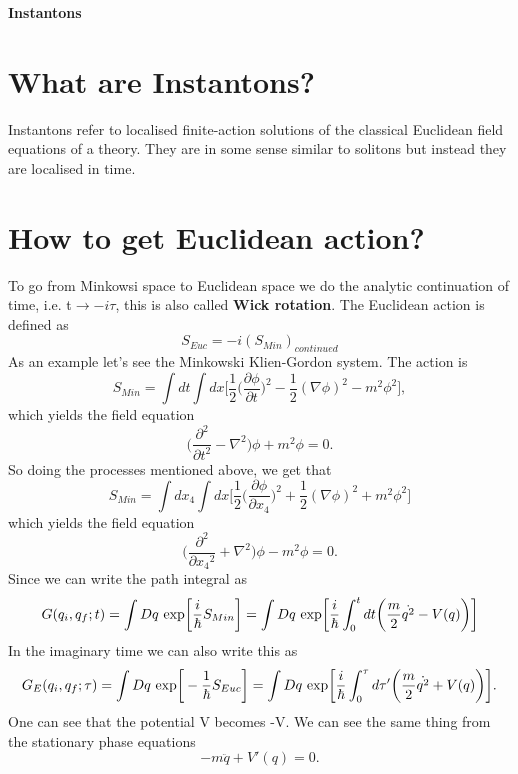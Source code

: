\documentclass[a4paper, 12pt]{article}
\begin{document}
\begin{center} 
{\Huge{\textbf{Instantons}}}\\
\end{center}

\section {What are Instantons?}
Instantons refer to localised finite-action solutions of the classical Euclidean field equations of a theory. They are in some sense similar to solitons but instead they are localised in time. 
\section {How to get Euclidean action?}
To go from Minkowsi space to Euclidean space we do the analytic continuation of time, i.e. t$\to -i\tau$, this is also called \textbf{Wick rotation}. The Euclidean action is defined as
\begin{equation}
S_{Euc} = -i(S_{Min})_{continued}
\end{equation}
As an example let's see the Minkowski Klien-Gordon system. The action is 
\begin{equation}
S_{Min} = \int dt \int dx \bigg[\frac{1}{2}\bigg(\frac{\partial\phi}{\partial t} \bigg)^2 - \frac{1}{2}(\nabla \phi)^2 -m^2 \phi^2  \bigg],
\end{equation}
which yields the field equation
\begin{equation}
\bigg( \frac{\partial^2}{\partial t^2} - \nabla^2 \bigg)\phi + m^2\phi = 0.
\end{equation}
So doing the processes mentioned above, we get that
\begin{equation}
S_{Min} = \int dx_4 \int dx \bigg[\frac{1}{2}\bigg(\frac{\partial\phi}{\partial x_4} \bigg)^2 + \frac{1}{2}(\nabla \phi)^2 + m^2 \phi^2  \bigg]
\end{equation}
which yields the field equation
\begin{equation}
\bigg( \frac{\partial^2}{\partial {x_4}^2} + \nabla^2 \bigg)\phi - m^2\phi = 0.
\end{equation}
Since we can write the path integral as
\begin{equation}
G(q_i,q_f;t) = \int Dq \*\ \textrm{exp}\bigg[\frac{i}{\hbar}S_{Min}\bigg] =  \int Dq \*\ \textrm{exp}\bigg[\frac{i}{\hbar}\int_0^t dt \bigg(\frac{m}{2}\dot{q^2} - V(q) \bigg) \bigg]
\end{equation}
In the imaginary time we can also write this as
\begin{equation}
G_E(q_i,q_f;\tau) = \int Dq \*\ \textrm{exp}\bigg[-\frac{1}{\hbar}S_{Euc}\bigg] =  \int Dq \*\ \textrm{exp}\bigg[\frac{i}{\hbar}\int_0^\tau d\tau' \bigg(\frac{m}{2}\dot{q^2} + V(q) \bigg) \bigg].
\end{equation}
One can see that the potential V becomes -V. We can see the same thing from the stationary phase equations
\begin{equation}
-m\ddot{q} + V'(q) = 0.
\end{equation}
\end{document}
